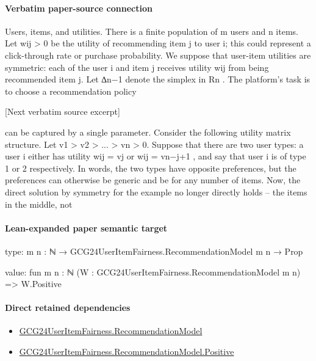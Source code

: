 \documentclass[10pt]{article}
\begin{document}
\paragraph{Verbatim paper-source connection}
\begin{ReviewVerbatim}
Users, items, and utilities. There is a finite population of m users and n items. Let wij > 0 be
the utility of recommending item j to user i; this could represent a click-through rate or purchase
probability. We suppose that user-item utilities are symmetric: each of the user i and item j receives
utility wij from being recommended item j.
Let ∆n−1 denote the simplex in Rn . The platform’s task is to choose a recommendation policy

[Next verbatim source excerpt]

can be captured by a single parameter. Consider the following utility matrix structure. Let v1 >
v2 > ... > vn > 0. Suppose that there are two user types: a user i either has utility wij = vj or
wij = vn−j+1 , and say that user i is of type 1 or 2 respectively. In words, the two types have opposite
preferences, but the preferences can otherwise be generic and be for any number of items. Now, the
direct solution by symmetry for the example no longer directly holds – the items in the middle, not
\end{ReviewVerbatim}



\paragraph{Lean-expanded paper semantic target}
\begin{ReviewVerbatim}
type:
{m n : ℕ} → GCG24UserItemFairness.RecommendationModel m n → Prop

value:
fun {m n : ℕ} (W : GCG24UserItemFairness.RecommendationModel m n) => W.Positive
\end{ReviewVerbatim}

\paragraph{Direct retained dependencies}
\begin{itemize}\raggedright
\item \hyperlink{governing-declaration-4b845f20f80fb146}{GCG24\allowbreak{}User\allowbreak{}Item\allowbreak{}Fairness.\allowbreak{}Recommendation\allowbreak{}Model}
\item \hyperlink{governing-declaration-7ed309cdf4b5e0ea}{GCG24\allowbreak{}User\allowbreak{}Item\allowbreak{}Fairness.\allowbreak{}Recommendation\allowbreak{}Model.\allowbreak{}Positive}
\end{itemize}
\end{document}
